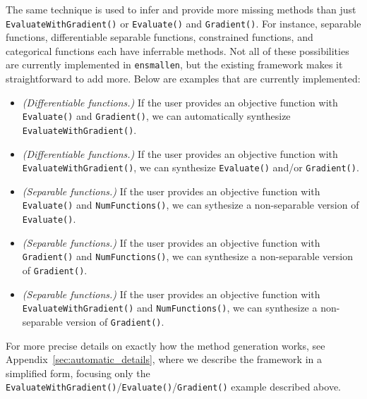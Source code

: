 The same technique is used to infer and provide more missing methods than
just {\tt EvaluateWithGradient()} or {\tt Evaluate()} and {\tt Gradient()}.  
For instance, separable functions, differentiable separable functions, constrained
functions, and categorical functions each have inferrable methods.  Not all of
these possibilities are currently implemented in {\tt ensmallen}, but the
existing framework makes it straightforward to add more.  Below are
examples that are currently implemented:

\begin{itemize}
  \item {\it (Differentiable functions.)}  If the user provides an objective
function with {\tt Evaluate()} and {\tt Gradient()}, we can automatically
synthesize {\tt EvaluateWithGradient()}.

  \item {\it (Differentiable functions.)}  If the user provides an objective
function with {\tt EvaluateWithGradient()}, we can synthesize {\tt Evaluate()}
and/or {\tt Gradient()}.

  \item {\it (Separable functions.)}  If the user provides an objective
function with {\tt Evaluate()} and {\tt NumFunctions()}, we can sythesize a
non-separable version of {\tt Evaluate()}.

  \item {\it (Separable functions.)}  If the user provides an objective function
with {\tt Gradient()} and {\tt NumFunctions()}, we can synthesize a
non-separable version of {\tt Gradient()}.

  \item {\it (Separable functions.)}  If the user provides an objective
function with {\tt EvaluateWithGradient()} and {\tt NumFunctions()}, we can
synthesize a non-separable version of {\tt Gradient()}.
\end{itemize}

For more precise details on exactly how the method generation works,
see Appendix~\ref{sec:automatic_details},
where we describe the framework in a simplified form,
focusing only the {\tt EvaluateWithGradient()}/{\tt Evaluate()}/{\tt Gradient()}
example described above.
